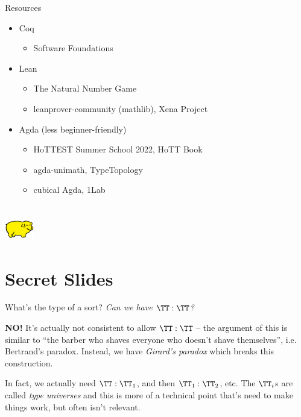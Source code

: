 \documentclass{beamer}
\begin{document}
\begin{frame}{Resources}
  \begin{itemize}
    \item Coq
      \begin{itemize}
        \item Software Foundations
      \end{itemize}
    \item Lean 
      \begin{itemize}
        \item The Natural Number Game
        \item leanprover-community (mathlib), Xena Project  
      \end{itemize}
    \item Agda {\scriptsize(less beginner-friendly)}
      \begin{itemize}
        \item HoTTEST Summer School 2022, HoTT Book
        \item agda-unimath, TypeTopology
        \item cubical Agda, 1Lab 
      \end{itemize}
  \end{itemize}
\end{frame}

\section{\texorpdfstring{\includegraphics[width=36pt]{yellowPig.png}}{P.I.G.}}

\backupbegin

\section{Secret Slides}

\begin{frame}{What's the type of a sort?}
  \emph{Can we have $\TT : \TT$?}
  \pause \vspace{12pt}

  \textbf{NO!} It's actually not consistent to allow $\TT :
    \TT$  -- the argument of this
    is similar to ``the barber who shaves everyone who doesn't shave
    themselves'', i.e. Bertrand's paradox.
    Instead, we have \emph{Girard's
    paradox} which breaks this construction. 
    \pause \vspace{12pt}

    In fact, we actually
    need $\TT : \TT_1$, and then $\TT_1 : \TT_2$, etc. The $\TT_i$s are called
    \emph{type universes} and this is more of a technical point that's need to
    make things work, but often isn't relevant.  
\end{frame}
\end{document}

